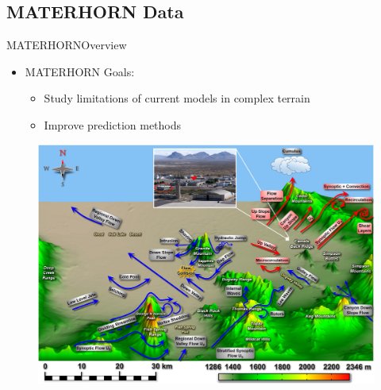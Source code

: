 \documentclass{beamer}
\begin{document}
\subsection{MATERHORN Data}

\begin{frame}{MATERHORN}{Overview}
  \begin{itemize}
  \item {MATERHORN Goals:}
  	\begin{itemize}
  	\item {Study limitations of current models in complex terrain}
  	\item {Improve prediction methods}
  	\end{itemize}
  \end{itemize}
  \begin{figure}
  \includegraphics[scale=.4]{pictures/complex.jpeg}
\\  \tiny{\textit{\cite{MATERHORN}}} %
  \end{figure}
  \end{frame}
  
\end{document}
